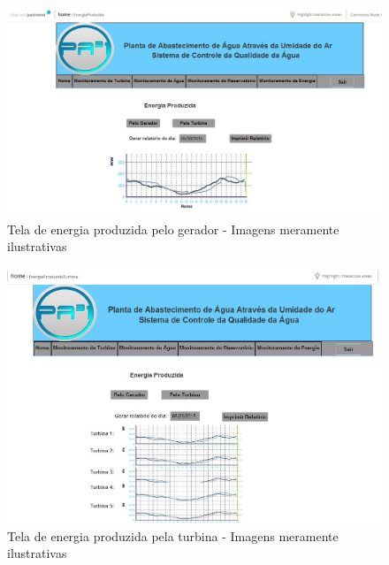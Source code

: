 \begin{center}
\begin{figure}[!ht]
\centering
\includegraphics[scale=0.5]{figuras/16}
\caption[Tela de energia produzida pelo gerador]{Tela de energia produzida pelo gerador - Imagens meramente ilustrativas}
\label{tela_energia_produzida}
\end{figure}
\clearpage

\begin{figure}[!ht]
\centering
\includegraphics[scale=0.5]{figuras/17}
\caption[Tela de energia produzida pela turbina]{Tela de energia produzida pela turbina - Imagens meramente ilustrativas}
\label{tela_energia_produzida_turbina}
\end{figure}
\clearpage


\end{center}
